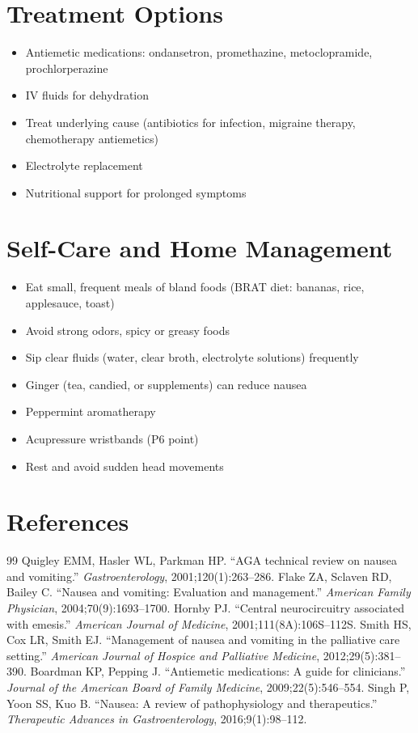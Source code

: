 \section*{Treatment Options}
\begin{itemize}
\item Antiemetic medications: ondansetron, promethazine, metoclopramide, prochlorperazine
\item IV fluids for dehydration
\item Treat underlying cause (antibiotics for infection, migraine therapy, chemotherapy antiemetics)
\item Electrolyte replacement
\item Nutritional support for prolonged symptoms
\end{itemize}

\section*{Self-Care and Home Management}
\begin{itemize}
\item Eat small, frequent meals of bland foods (BRAT diet: bananas, rice, applesauce, toast)
\item Avoid strong odors, spicy or greasy foods
\item Sip clear fluids (water, clear broth, electrolyte solutions) frequently
\item Ginger (tea, candied, or supplements) can reduce nausea
\item Peppermint aromatherapy
\item Acupressure wristbands (P6 point)
\item Rest and avoid sudden head movements
\end{itemize}

\section*{References}
\begin{thebibliography}{99}
 Quigley EMM, Hasler WL, Parkman HP. ``AGA technical review on nausea and vomiting.'' \textit{Gastroenterology}, 2001;120(1):263--286.
 Flake ZA, Sclaven RD, Bailey C. ``Nausea and vomiting: Evaluation and management.'' \textit{American Family Physician}, 2004;70(9):1693--1700.
 Hornby PJ. ``Central neurocircuitry associated with emesis.'' \textit{American Journal of Medicine}, 2001;111(8A):106S--112S.
 Smith HS, Cox LR, Smith EJ. ``Management of nausea and vomiting in the palliative care setting.'' \textit{American Journal of Hospice and Palliative Medicine}, 2012;29(5):381--390.
 Boardman KP, Pepping J. ``Antiemetic medications: A guide for clinicians.'' \textit{Journal of the American Board of Family Medicine}, 2009;22(5):546--554.
 Singh P, Yoon SS, Kuo B. ``Nausea: A review of pathophysiology and therapeutics.'' \textit{Therapeutic Advances in Gastroenterology}, 2016;9(1):98--112.
\end{thebibliography}
